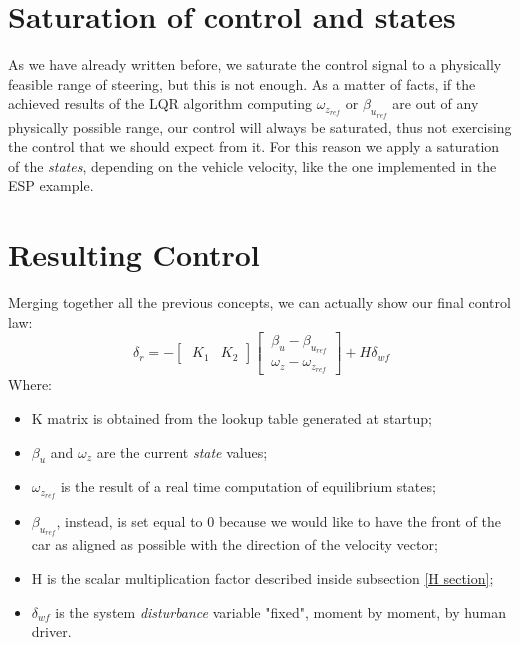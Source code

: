 \section{Saturation of control and states}
As we have already written before, we saturate the control signal to a physically feasible range of steering, but this is not enough. As a matter of facts, if the achieved results of the LQR algorithm computing $\omega_{z_{ref}}$ or $\beta_{u_{ref}}$ are out of any physically possible range, our control will always be saturated, thus not exercising the control that we should expect from it. For this reason we apply a saturation of the \textit{states}, depending on the vehicle velocity, like the one implemented in the ESP example.
\section{Resulting Control}
 Merging together all the previous concepts, we can actually show our final control law:
\begin{equation} \label{Resulting Control}
	\ \delta_{r} = -
	\begin{bmatrix}
	\ K_{1} & K_{2}
	\end{bmatrix}
	\begin{bmatrix}
	\ \beta_{u}-\beta_{u_{ref}} \\
	\ \omega_{z}-\omega_{z_{ref}}
	\end{bmatrix} +
	H \delta_{wf}
\end{equation}
Where:
\begin{itemize}
	\item K matrix is obtained from the lookup table generated at startup;
	\item $\beta_{u}$ and $\omega_{z}$ are the current \textit{state} values;
	\item $\omega_{z_{ref}}$ is the result of a real time computation of equilibrium states;
	\item $\beta_{u_{ref}}$, instead, is set equal to 0 because we would like to have the front of the car as aligned as possible with the direction of the velocity vector;
	\item H is the scalar multiplication factor described inside subsection \ref{H section};
	\item $\delta_{wf}$ is the system \textit{disturbance} variable "fixed", moment by moment, by human driver.
\end{itemize}
